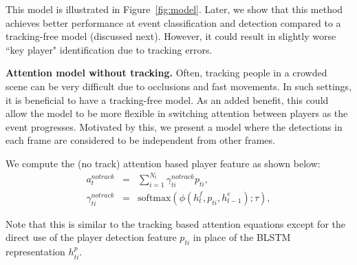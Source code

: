 This model is illustrated in Figure~\ref{fig:model}.
Later, we show that this method achieves better
performance at event classification and detection compared to a
tracking-free model (discussed next). However, it could result in slightly worse ``key player"
identification due to tracking errors.

\noindent \textbf{Attention model without tracking.}
Often, tracking people in a crowded scene can be very difficult due to
occlusions and fast movements. In such settings, it is beneficial to have a
tracking-free model.  As an added benefit, this could allow the model to be
more flexible in switching attention between players as the event progresses.
Motivated by this, we present a model where the detections in each frame are
considered to be independent from other frames. 

We  compute the (no track) attention based player feature as shown below:
\begin{eqnarray} 
\label{eq:notrack}
  a_t^{notrack} & = & \sum_{i=1}^{N_t} \gamma_{ti}^{notrack} p_{ti},
\\ \nonumber
  \gamma_{ti}^{notrack} & = & \text{softmax} \left(\phi\left(h^f_t, p_{ti}, h^e_{t-1}\right); \tau\right),
\end{eqnarray}

Note that this is similar to the tracking based attention equations except for
the direct use of the player detection feature $p_{ti}$ in place of the
BLSTM representation $h_{ti}^p$.
